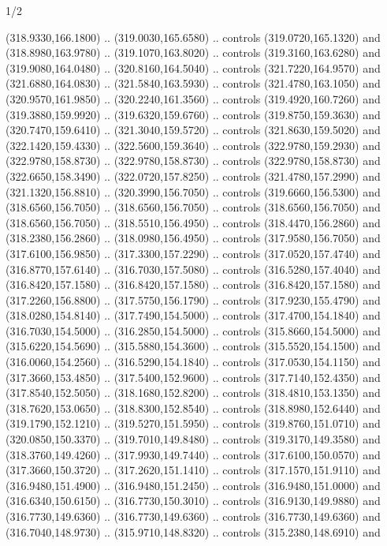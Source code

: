 \begin{flagdescription}{1/2}
\begin{scope}[xshift=0.5\flaglength]
\begin{scope}[scale=0.004\flagwidth,xshift=-90mm,yshift=89mm]
\begin{scope}[y=0.80pt, x=0.80pt, yscale=-1, xscale=1, inner sep=0pt, outer sep=0pt]
  (318.9330,166.1800) .. (319.0030,165.6580) .. controls (319.0720,165.1320) and
  (318.8980,163.9780) .. (319.1070,163.8020) .. controls (319.3160,163.6280) and
  (319.9080,164.0480) .. (320.8160,164.5040) .. controls (321.7220,164.9570) and
  (321.6880,164.0830) .. (321.5840,163.5930) .. controls (321.4780,163.1050) and
  (320.9570,161.9850) .. (320.2240,161.3560) .. controls (319.4920,160.7260) and
  (319.3880,159.9920) .. (319.6320,159.6760) .. controls (319.8750,159.3630) and
  (320.7470,159.6410) .. (321.3040,159.5720) .. controls (321.8630,159.5020) and
  (322.1420,159.4330) .. (322.5600,159.3640) .. controls (322.9780,159.2930) and
  (322.9780,158.8730) .. (322.9780,158.8730) .. controls (322.9780,158.8730) and
  (322.6650,158.3490) .. (322.0720,157.8250) .. controls (321.4780,157.2990) and
  (321.1320,156.8810) .. (320.3990,156.7050) .. controls (319.6660,156.5300) and
  (318.6560,156.7050) .. (318.6560,156.7050) .. controls (318.6560,156.7050) and
  (318.6560,156.7050) .. (318.5510,156.4950) .. controls (318.4470,156.2860) and
  (318.2380,156.2860) .. (318.0980,156.4950) .. controls (317.9580,156.7050) and
  (317.6100,156.9850) .. (317.3300,157.2290) .. controls (317.0520,157.4740) and
  (316.8770,157.6140) .. (316.7030,157.5080) .. controls (316.5280,157.4040) and
  (316.8420,157.1580) .. (316.8420,157.1580) .. controls (316.8420,157.1580) and
  (317.2260,156.8800) .. (317.5750,156.1790) .. controls (317.9230,155.4790) and
  (318.0280,154.8140) .. (317.7490,154.5000) .. controls (317.4700,154.1840) and
  (316.7030,154.5000) .. (316.2850,154.5000) .. controls (315.8660,154.5000) and
  (315.6220,154.5690) .. (315.5880,154.3600) .. controls (315.5520,154.1500) and
  (316.0060,154.2560) .. (316.5290,154.1840) .. controls (317.0530,154.1150) and
  (317.3660,153.4850) .. (317.5400,152.9600) .. controls (317.7140,152.4350) and
  (317.8540,152.5050) .. (318.1680,152.8200) .. controls (318.4810,153.1350) and
  (318.7620,153.0650) .. (318.8300,152.8540) .. controls (318.8980,152.6440) and
  (319.1790,152.1210) .. (319.5270,151.5950) .. controls (319.8760,151.0710) and
  (320.0850,150.3370) .. (319.7010,149.8480) .. controls (319.3170,149.3580) and
  (318.3760,149.4260) .. (317.9930,149.7440) .. controls (317.6100,150.0570) and
  (317.3660,150.3720) .. (317.2620,151.1410) .. controls (317.1570,151.9110) and
  (316.9480,151.4900) .. (316.9480,151.2450) .. controls (316.9480,151.0000) and
  (316.6340,150.6150) .. (316.7730,150.3010) .. controls (316.9130,149.9880) and
  (316.7730,149.6360) .. (316.7730,149.6360) .. controls (316.7730,149.6360) and
  (316.7040,148.9730) .. (315.9710,148.8320) .. controls (315.2380,148.6910) and

\end{scope}
\end{scope}
\end{scope}
\end{flagdescription}
